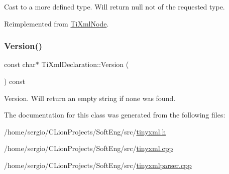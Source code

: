 Cast to a more defined type. Will return null not of the requested type. 



Reimplemented from \hyperlink{class_ti_xml_node_a4027136ca820ff4a636b607231b6a6df}{Ti\+Xml\+Node}.

\mbox{\label{class_ti_xml_declaration_a95cdcb9354ea220065bd378ffcacc7bd}} 
\subsubsection{\texorpdfstring{Version()}{Version()}}
{\footnotesize\ttfamily const char$\ast$ Ti\+Xml\+Declaration\+::\+Version (\begin{DoxyParamCaption}{ }\end{DoxyParamCaption}) const\hspace{0.3cm}{\ttfamily [inline]}}



Version. Will return an empty string if none was found. 



The documentation for this class was generated from the following files\+:\begin{DoxyCompactItemize}
\item 
/home/sergio/\+C\+Lion\+Projects/\+Soft\+Eng/src/\hyperlink{tinyxml_8h}{tinyxml.\+h}\item 
/home/sergio/\+C\+Lion\+Projects/\+Soft\+Eng/src/\hyperlink{tinyxml_8cpp}{tinyxml.\+cpp}\item 
/home/sergio/\+C\+Lion\+Projects/\+Soft\+Eng/src/\hyperlink{tinyxmlparser_8cpp}{tinyxmlparser.\+cpp}\end{DoxyCompactItemize}
